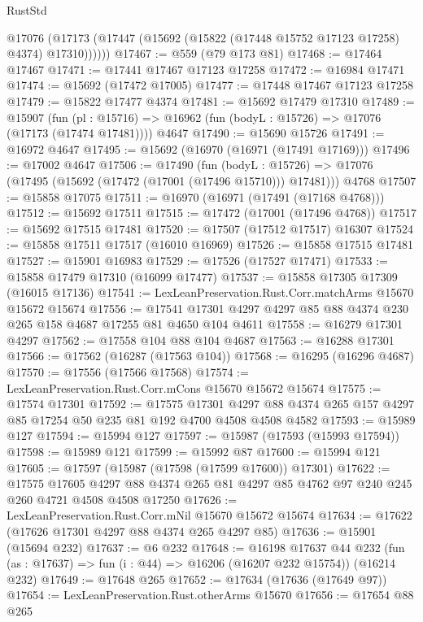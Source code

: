 \begin{lexlean}{RustStd}
\begin{coremodule}
        @17076 (@17173 (@17447 (@15692 (@15822 (@17448 @15752 @17123 @17258) @4374) @17310))))))
@17467 := @559 (@79 @173 @81)
@17468 := @17464 @17467
@17471 := @17441 @17467 @17123 @17258
@17472 := @16984 @17471
@17474 := @15692 (@17472 @17005)
@17477 := @17448 @17467 @17123 @17258
@17479 := @15822 @17477 @4374
@17481 := @15692 @17479 @17310
@17489 := @15907
    (fun (pl : @15716) => @16962 (fun (bodyL : @15726) => @17076 (@17173 (@17474 @17481))))
    @4647
@17490 := @15690 @15726
@17491 := @16972 @4647
@17495 := @15692 (@16970 (@16971 (@17491 @17169)))
@17496 := @17002 @4647
@17506 := @17490
    (fun (bodyL : @15726) => @17076 (@17495 (@15692 (@17472 (@17001 (@17496 @15710))) @17481)))
    @4768
@17507 := @15858 @17075
@17511 := @16970 (@16971 (@17491 (@17168 @4768)))
@17512 := @15692 @17511
@17515 := @17472 (@17001 (@17496 @4768))
@17517 := @15692 @17515 @17481
@17520 := @17507 (@17512 @17517) @16307
@17524 := @15858 @17511 @17517 (@16010 @16969)
@17526 := @15858 @17515 @17481
@17527 := @15901 @16983
@17529 := @17526 (@17527 @17471)
@17533 := @15858 @17479 @17310 (@16099 @17477)
@17537 := @15858 @17305 @17309 (@16015 @17136)
@17541 := LexLeanPreservation.Rust.Corr.matchArms @15670 @15672 @15674
@17556 := @17541 @17301 @4297 @4297 @85 @88 @4374 @230 @265 @158 @4687 @17255 @81 @4650 @104 @4611
@17558 := @16279 @17301 @4297
@17562 := @17558 @104 @88 @104 @4687
@17563 := @16288 @17301
@17566 := @17562 (@16287 (@17563 @104))
@17568 := @16295 (@16296 @4687)
@17570 := @17556 (@17566 @17568)
@17574 := LexLeanPreservation.Rust.Corr.mCons @15670 @15672 @15674
@17575 := @17574 @17301
@17592 := @17575
    @17301
    @4297
    @88
    @4374
    @265
    @157
    @4297
    @85
    @17254
    @50
    @235
    @81
    @192
    @4700
    @4508
    @4508
    @4582
@17593 := @15989 @127
@17594 := @15994 @127
@17597 := @15987 (@17593 (@15993 @17594))
@17598 := @15989 @121
@17599 := @15992 @87
@17600 := @15994 @121
@17605 := @17597 (@15987 (@17598 (@17599 @17600)) @17301)
@17622 := @17575
    @17605
    @4297
    @88
    @4374
    @265
    @81
    @4297
    @85
    @4762
    @97
    @240
    @245
    @260
    @4721
    @4508
    @4508
    @17250
@17626 := LexLeanPreservation.Rust.Corr.mNil @15670 @15672 @15674
@17634 := @17622 (@17626 @17301 @4297 @88 @4374 @265 @4297 @85)
@17636 := @15901 (@15694 @232)
@17637 := @6 @232
@17648 := @16198
    @17637
    @44
    @232
    (fun (as : @17637) => fun (i : @44) => @16206 (@16207 @232 @15754))
    (@16214 @232)
@17649 := @17648 @265
@17652 := @17634 (@17636 (@17649 @97))
@17654 := LexLeanPreservation.Rust.otherArms @15670
@17656 := @17654 @88 @265

\end{coremodule}
\end{lexlean}

